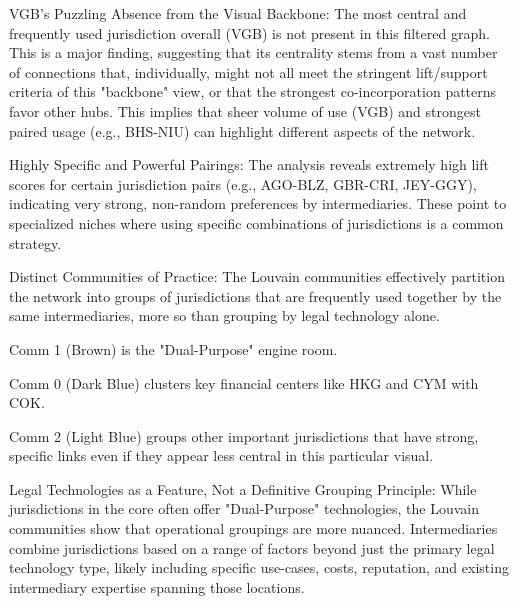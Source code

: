 VGB's Puzzling Absence from the Visual Backbone: The most central and frequently used jurisdiction overall (VGB) is not present in this filtered graph. This is a major finding, suggesting that its centrality stems from a vast number of connections that, individually, might not all meet the stringent lift/support criteria of this "backbone" view, or that the strongest co-incorporation patterns favor other hubs. This implies that sheer volume of use (VGB) and strongest paired usage (e.g., BHS-NIU) can highlight different aspects of the network.

Highly Specific and Powerful Pairings: The analysis reveals extremely high lift scores for certain jurisdiction pairs (e.g., AGO-BLZ, GBR-CRI, JEY-GGY), indicating very strong, non-random preferences by intermediaries. These point to specialized niches where using specific combinations of jurisdictions is a common strategy.

Distinct Communities of Practice: The Louvain communities effectively partition the network into groups of jurisdictions that are frequently used together by the same intermediaries, more so than grouping by legal technology alone.

Comm 1 (Brown) is the "Dual-Purpose" engine room.

Comm 0 (Dark Blue) clusters key financial centers like HKG and CYM with COK.

Comm 2 (Light Blue) groups other important jurisdictions that have strong, specific links even if they appear less central in this particular visual.

Legal Technologies as a Feature, Not a Definitive Grouping Principle: While jurisdictions in the core often offer "Dual-Purpose" technologies, the Louvain communities show that operational groupings are more nuanced. Intermediaries combine jurisdictions based on a range of factors beyond just the primary legal technology type, likely including specific use-cases, costs, reputation, and existing intermediary expertise spanning those locations.
